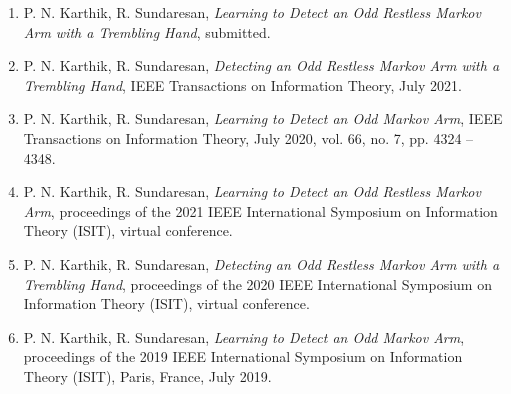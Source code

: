 \begin{enumerate}[1.]
\item P. N. Karthik, R. Sundaresan, {\em Learning to Detect an Odd Restless Markov Arm with a Trembling Hand}, submitted.
\item P. N. Karthik, R. Sundaresan, {\em Detecting an Odd Restless Markov Arm with a Trembling Hand}, IEEE Transactions on Information Theory, July 2021.
\item P. N. Karthik, R. Sundaresan, {\em Learning to Detect an Odd Markov Arm}, IEEE Transactions on Information Theory, July 2020, vol. 66, no. 7, pp. 4324 – 4348.
\item P. N. Karthik, R. Sundaresan, {\em Learning to Detect an Odd Restless Markov Arm},  
proceedings of the 2021 IEEE International Symposium on Information Theory (ISIT), virtual conference.
\item P. N. Karthik, R. Sundaresan, {\em Detecting an Odd Restless Markov Arm with a Trembling Hand}, proceedings of the 2020 IEEE International Symposium on Information Theory (ISIT), virtual conference.
\item P. N. Karthik, R. Sundaresan, {\em Learning to Detect an Odd Markov Arm}, proceedings of the 2019 IEEE International Symposium on Information Theory (ISIT), Paris, France, July 2019. 
\end{enumerate}
